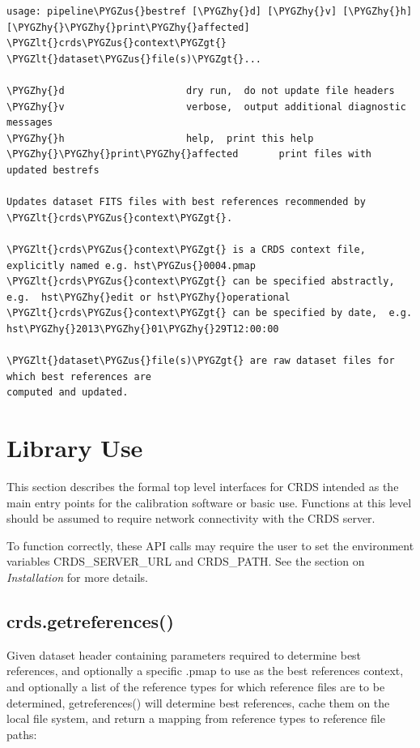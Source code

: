 \documentclass[letterpaper,10pt,english]{sphinxmanual}
\def\PYGZus{\char`\_}
\def\PYGZlt{\char`\<}
\def\PYGZgt{\char`\>}
\def\PYGZhy{\char`\-}
\begin{document}
\begin{Verbatim}[commandchars=\\\{\}]
usage: pipeline\PYGZus{}bestref [\PYGZhy{}d] [\PYGZhy{}v] [\PYGZhy{}h] [\PYGZhy{}\PYGZhy{}print\PYGZhy{}affected] \PYGZlt{}crds\PYGZus{}context\PYGZgt{} \PYGZlt{}dataset\PYGZus{}file(s)\PYGZgt{}...

\PYGZhy{}d                     dry run,  do not update file headers
\PYGZhy{}v                     verbose,  output additional diagnostic messages
\PYGZhy{}h                     help,  print this help
\PYGZhy{}\PYGZhy{}print\PYGZhy{}affected       print files with updated bestrefs

Updates dataset FITS files with best references recommended by \PYGZlt{}crds\PYGZus{}context\PYGZgt{}.

\PYGZlt{}crds\PYGZus{}context\PYGZgt{} is a CRDS context file, explicitly named e.g. hst\PYGZus{}0004.pmap
\PYGZlt{}crds\PYGZus{}context\PYGZgt{} can be specified abstractly,  e.g.  hst\PYGZhy{}edit or hst\PYGZhy{}operational
\PYGZlt{}crds\PYGZus{}context\PYGZgt{} can be specified by date,  e.g.  hst\PYGZhy{}2013\PYGZhy{}01\PYGZhy{}29T12:00:00

\PYGZlt{}dataset\PYGZus{}file(s)\PYGZgt{} are raw dataset files for which best references are
computed and updated.
\end{Verbatim}


\chapter{Library Use}
\label{top_level_use:library-use}\label{top_level_use::doc}
This section describes the formal top level interfaces for CRDS intended as the
main entry points for the calibration software or basic use.  Functions
at this level should be assumed to require network connectivity with the CRDS
server.

To function correctly,  these API calls may require the user to set the
environment variables CRDS\_SERVER\_URL and CRDS\_PATH.   See the section on
\emph{Installation} for more details.


\section{crds.getreferences()}
\label{top_level_use:crds-getreferences}
Given  dataset header containing parameters required to determine best
references, and optionally a specific .pmap to use as the best references
context,  and optionally a list of the reference types for which reference files
are to be determined,  getreferences() will determine best references,  cache
them on the local file system,  and return a mapping from reference types to
reference file paths:
\end{document}
